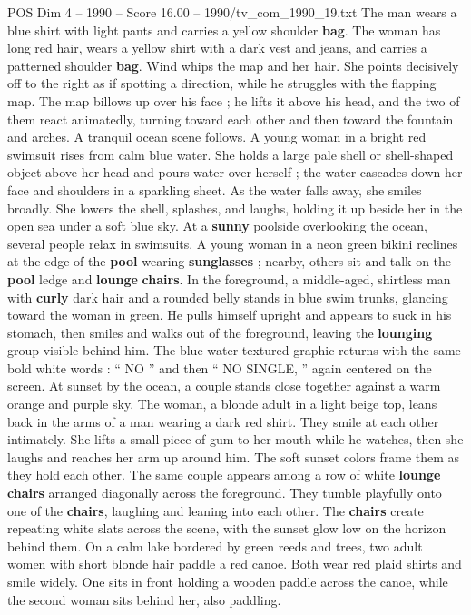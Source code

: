 \begin{textsample}{POS Dim 4 – 1990 – Score 16.00 – 1990/tv\_com\_1990\_19.txt}
The man wears a blue shirt with light pants and carries a yellow shoulder \textbf{bag}.
The woman has long red hair, wears a yellow shirt with a dark vest and jeans, and carries a patterned shoulder \textbf{bag}.
Wind whips the map and her hair.
She points decisively off to the right as if spotting a direction, while he struggles with the flapping map.
The map billows up over his face ; he lifts it above his head, and the two of them react animatedly, turning toward each other and then toward the fountain and arches.
A tranquil ocean scene follows.
A young woman in a bright red swimsuit rises from calm blue water.
She holds a large pale shell or shell-shaped object above her head and pours water over herself ; the water cascades down her face and shoulders in a sparkling sheet.
As the water falls away, she smiles broadly.
She lowers the shell, splashes, and laughs, holding it up beside her in the open sea under a soft blue sky.
At a \textbf{sunny} poolside overlooking the ocean, several people relax in swimsuits.
A young woman in a neon green bikini reclines at the edge of the \textbf{pool} wearing \textbf{sunglasses} ; nearby, others sit and talk on the \textbf{pool} ledge and \textbf{lounge} \textbf{chairs}.
In the foreground, a middle-aged, shirtless man with \textbf{curly} dark hair and a rounded belly stands in blue swim trunks, glancing toward the woman in green.
He pulls himself upright and appears to suck in his stomach, then smiles and walks out of the foreground, leaving the \textbf{lounging} group visible behind him.
The blue water-textured graphic returns with the same bold white words : “ NO ” and then “ NO SINGLE, ” again centered on the screen.
At sunset by the ocean, a couple stands close together against a warm orange and purple sky.
The woman, a blonde adult in a light beige top, leans back in the arms of a man wearing a dark red shirt.
They smile at each other intimately.
She lifts a small piece of gum to her mouth while he watches, then she laughs and reaches her arm up around him.
The soft sunset colors frame them as they hold each other.
The same couple appears among a row of white \textbf{lounge} \textbf{chairs} arranged diagonally across the foreground.
They tumble playfully onto one of the \textbf{chairs}, laughing and leaning into each other.
The \textbf{chairs} create repeating white slats across the scene, with the sunset glow low on the horizon behind them.
On a calm lake bordered by green reeds and trees, two adult women with short blonde hair paddle a red canoe.
Both wear red plaid shirts and smile widely.
One sits in front holding a wooden paddle across the canoe, while the second woman sits behind her, also paddling.

\end{textsample}
